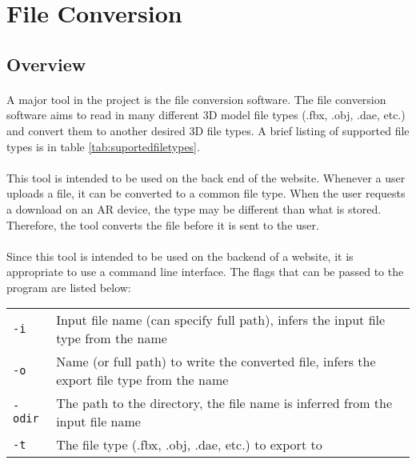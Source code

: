 
 \section{File Conversion}

    \subsection{Overview}
    \paragraph{}
    A major tool in the project is the file conversion software.  
    The file conversion software aims to read in many different 3D model file types (.fbx, .obj, .dae, etc.) and convert them to another desired 3D file types.  
    A brief listing of supported file types is in table \ref{tab:suportedfiletypes}.
    
    \paragraph{}
    This tool is intended to be used on the back end of the website.  Whenever a user uploads a file, it can be converted to a common file type.
    When the user requests a download on an AR device, the type may be different than what is stored. Therefore, the tool converts the file before
    it is sent to the user.
    
    \paragraph{}
    Since this tool is intended to be used on the backend of a website, it is appropriate to use a command line interface.  
    The flags that can be passed to the program are listed below:
    
    \begin{table}[h]
        \centering
        \begin{tabular}{l  l}
            \texttt{-i} & Input file name (can specify full path), infers the input file type from the name \\
            \texttt{-o} & Name (or full path) to write the converted file, infers the export file type from the name \\
            \texttt{-odir} & The path to the directory, the file name is inferred from the input file name \\
            \texttt{-t} & The file type (.fbx, .obj, .dae, etc.) to export to
        \end{tabular}
    \end{table}
    
